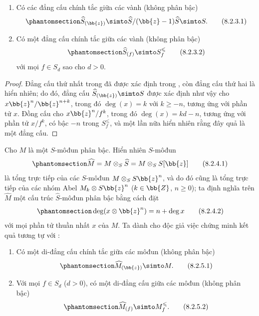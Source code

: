 \documentclass[oneside,10pt]{amsart}
\renewcommand{\leq}{\leqslant}
\renewcommand{\geq}{\geqslant}
\let\EGAOriginalLabel\label
\renewcommand{\label}[1]{\phantomsection\EGAOriginalLabel{#1}}
\begin{document}
\begin{lemma}[8.2.3]
\label{II.8.2.3}
\begin{enumerate}
  \item[\rm{(i)}] Có các đẳng cấu chính tắc giữa các vành (không phân bậc)
    \[
    \label{II.8.2.3.1}
      \widehat{S}_{(\bb{z})}
      \simto
      \widehat{S}/(\bb{z}-1)\widehat{S}
      \simto
      S.
    \tag{8.2.3.1}
    \]
  \item[\rm{(ii)}] Có một đẳng cấu chính tắc giữa các vành (không phân bậc)
    \[
    \label{II.8.2.3.2}
      \widehat{S}_{(f)} \simto S_f^\leq
    \tag{8.2.3.2}
    \]
    với mọi $f\in S_d$ sao cho $d>0$.
\end{enumerate}
\end{lemma}

\begin{proof}
Đẳng cấu thứ nhất trong  đã được xác định trong , còn đẳng cấu thứ hai là hiển nhiên;
do đó, đẳng cấu $\widehat{S}_{(\bb{z})}\simto S$ được xác định như vậy cho $x\bb{z}^n/\bb{z}^{n+k}$, trong đó $\deg(x)=k$ với $k\geq-n$, tương ứng với phần tử $x$.
Đồng cấu  cho $x\bb{z}^n/f^k$, trong đó $\deg(x)=kd-n$, tương ứng với phần tử $x/f^k$, có bậc $-n$ trong $S_f^\leq$, và một lần nữa hiển nhiên rằng đây quả là một đẳng cấu.
\end{proof}

\begin{env}[8.2.4]
\label{II.8.2.4}
Cho $M$ là một $S$-môđun phân bậc.
Hiển nhiên $S$-môđun
\[
\label{II.8.2.4.1}
  \widehat{M}=M\otimes_S\widehat{S}=M\otimes_SS[\bb{z}]
\tag{8.2.4.1}
\]
là tổng trực tiếp của các $S$-môđun $M\otimes_SS\bb{z}^n$, và do đó cũng là tổng trực tiếp của các nhóm Abel $M_k\otimes S\bb{z}^n$ ($k\in\bb{Z}$, $n\geq0$);
ta định nghĩa trên $\widehat{M}$ một cấu trúc $\widehat{S}$-môđun phân bậc bằng cách đặt
\[
\label{II.8.2.4.2}
  \deg(x\otimes\bb{z}^n)=n+\deg x
\tag{8.2.4.2}
\]
với mọi phần tử thuần nhất $x$ của $M$.
Ta dành cho độc giả việc chứng minh kết quả tương tự với :
\end{env}

\begin{lemma}[8.2.5]
\label{II.8.2.5}
\begin{enumerate}
  \item[\rm{(i)}] Có một di-đẳng cấu chính tắc giữa các môđun (không phân bậc)
    \[
    \label{II.8.2.5.1}
      \widehat{M}_{(\bb{z})} \simto M.
    \tag{8.2.5.1}
    \]
  \item[\rm{(ii)}] Với mọi $f\in S_d$ ($d>0$), có một di-đẳng cấu giữa các môđun (không phân bậc)
    \[
    \label{II.8.2.5.2}
      \widehat{M}_{(f)} \simto M_f^\leq.
    \tag{8.2.5.2}
    \]
\end{enumerate}
\end{lemma}
\end{document}
